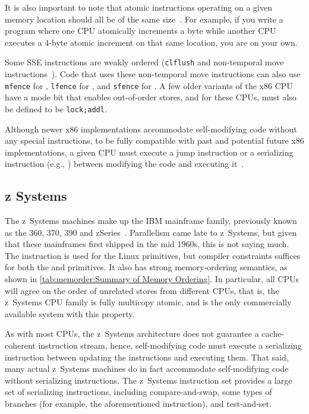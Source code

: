 It is also important to note that atomic instructions operating
on a given memory location should all be of the same
size~\cite[Section 8.1.2.2]{Intel64IA32v3A2016}.
For example, if you write a program where one CPU atomically increments
a byte while another CPU executes a 4-byte atomic increment on
that same location, you are on your own.

Some SSE instructions are weakly ordered ({\tt clflush}
and non-temporal move instructions~\cite{IntelXeonV2b-96a}).
Code that uses these non-temporal move instructions
can also use {\tt mfence} for ,
{\tt lfence} for , and {\tt sfence} for .
A few older variants of the x86 CPU have a mode bit that enables out-of-order
stores, and for these CPUs,  must also be defined to
be {\tt lock;addl}.

Although newer x86 implementations accommodate self-modifying code
without any special instructions, to be fully compatible with
past and potential future x86 implementations, a given CPU must
execute a jump instruction or a serializing instruction (e.g., )
between modifying the code and executing
it~\cite[Section 8.1.3]{Intel64IA32v3A2011}.

\subsection{z Systems}

The z~Systems machines make up the IBM mainframe family, previously
known as the 360, 370, 390 and zSeries~\cite{IBMzSeries04a}.
Parallelism came late to z~Systems, but given that these mainframes first
shipped in the mid 1960s, this is not saying much.
The  instruction is used for the Linux  primitives,
but compiler constraints suffices for both the
 and  primitives.
It also has strong memory-ordering semantics, as shown in
\cref{tab:memorder:Summary of Memory Ordering}.
In particular, all CPUs will agree on the order of unrelated stores from
different CPUs, that is, the z~Systems CPU family is fully multicopy
atomic, and is the only commercially available system with this property.

As with most CPUs, the z~Systems architecture does not guarantee a
cache-coherent instruction stream, hence,
self-modifying code must execute a serializing instruction between updating
the instructions and executing them.
That said, many actual z~Systems machines do in fact accommodate self-modifying
code without serializing instructions.
The z~Systems instruction set provides a large set of serializing instructions,
including compare-and-swap, some types of branches (for example, the
aforementioned  instruction), and test-and-set.

